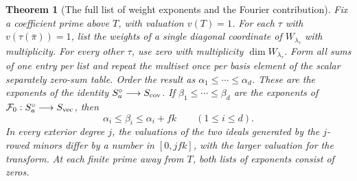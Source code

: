 \documentclass[a4paper,11pt]{article}
\newtheorem{theorem}[proposition]{Theorem}
\theoremstyle{definition}
\theoremstyle{remark}
\numberwithin{equation}{section}
\begin{document}
\begin{theorem}[The full list of weight exponents and the Fourier contribution]\leavevmode
\label{thm:fourierslopes354}
Fix a coefficient prime above \(T\), with valuation \(v(T)=1\).
For each \(\tau\) with \(v(\tau(\bar\pi))=1\), list the weights
of a single diagonal coordinate of \(W_{\lambda_\tau}\) with
multiplicity. For every other \(\tau\), use zero with multiplicity
\(\dim W_{\lambda_\tau}\). Form all sums of one entry per list
and repeat the multiset once per basis element of the scalar
separately zero-sum table. Order the result as
\(\alpha_1\le\cdots\le\alpha_d\). These are the exponents of the
identity \(S_a^\circ\longrightarrow S_{\rm cov}\).
If \(\beta_1\le\cdots\le\beta_d\) are the exponents of
\(\mathcal F_0:S_a^\circ\longrightarrow S_{\rm vec}\), then
\[
        \alpha_i\le\beta_i\le\alpha_i+fk
                        \qquad(1\le i\le d).
\]
In every exterior degree \(j\), the valuations of the two ideals
generated by the \(j\)-rowed minors differ by a number in
\([0,jfk]\), with the larger valuation for the transform.
At each finite prime away from \(T\), both lists of exponents
consist of zeros.
\end{theorem}
\end{document}
